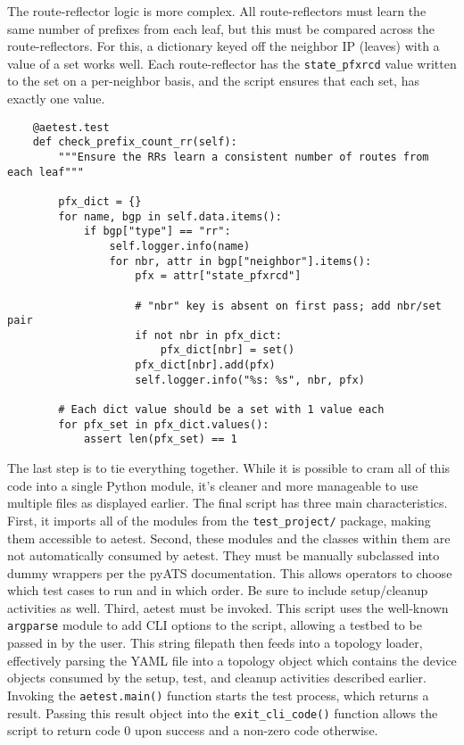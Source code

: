 The route-reflector logic is more complex. All route-reflectors must learn the
same number of prefixes from each leaf, but this must be compared across the
route-reflectors. For this, a dictionary keyed off the neighbor IP (leaves)
with a value of a set works well. Each route-reflector has the
\verb|state_pfxrcd| value written to the set on a per-neighbor basis, and
the script ensures that each set, has exactly one value.

\begin{verbatim}
    @aetest.test
    def check_prefix_count_rr(self):
        """Ensure the RRs learn a consistent number of routes from each leaf"""

        pfx_dict = {}
        for name, bgp in self.data.items():
            if bgp["type"] == "rr":
                self.logger.info(name)
                for nbr, attr in bgp["neighbor"].items():
                    pfx = attr["state_pfxrcd"]

                    # "nbr" key is absent on first pass; add nbr/set pair
                    if not nbr in pfx_dict:
                        pfx_dict[nbr] = set()
                    pfx_dict[nbr].add(pfx)
                    self.logger.info("%s: %s", nbr, pfx)

        # Each dict value should be a set with 1 value each
        for pfx_set in pfx_dict.values():
            assert len(pfx_set) == 1
\end{verbatim}

The last step is to tie everything together. While it is possible to cram all
of this code into a single Python module, it's cleaner and more manageable to
use multiple files as displayed earlier. The final script has three main
characteristics. First, it imports all of the modules from the
\verb|test_project/| package, making them accessible to aetest. Second,
these modules and the classes within them are not automatically consumed by
aetest. They must be manually subclassed into dummy wrappers per the pyATS
documentation. This allows operators to choose which test cases to run and in
which order. Be sure to include setup/cleanup activities as well. Third, aetest
must be invoked. This script uses the well-known \verb|argparse| module to
add CLI options to the script, allowing a testbed to be passed in by the user.
This string filepath then feeds into a topology loader, effectively parsing the
YAML file into a topology object which contains the device objects consumed
by the setup, test, and cleanup activities described earlier. Invoking the
\verb|aetest.main()| function starts the test process, which returns a result.
Passing this result object into the \verb|exit_cli_code()| function allows
the script to return code 0 upon success and a non-zero code otherwise.

